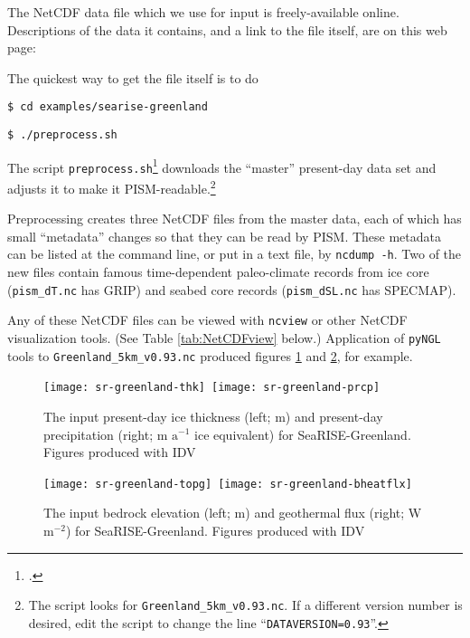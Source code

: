 The NetCDF data file which we use for input is freely-available online.  Descriptions of the data it contains, and a link to the file itself, are on this web page: 
\medskip

\centerline{}
\medskip

\noindent The quickest way to get the file itself is to do

\verb|$ cd examples/searise-greenland|

\verb|$ ./preprocess.sh|

\noindent The script \verb|preprocess.sh|\footnote{.} downloads the ``master'' present-day data set and adjusts it to make it PISM-readable.\footnote{The script looks for \texttt{Greenland\_5km\_v0.93.nc}.  If a different version number is desired, edit the script to change the line ``\texttt{DATAVERSION=0.93}''.}

Preprocessing creates three NetCDF files from the master data, each of which has small ``metadata'' changes so that they can be read by PISM.  These metadata can be listed at the command line, or put in a text file, by \verb|ncdump -h|.  Two of the new files contain famous time-dependent paleo-climate records from ice core (\verb|pism_dT.nc| has GRIP) and seabed core records (\verb|pism_dSL.nc| has SPECMAP).

Any of these NetCDF files can be viewed with \verb|ncview| or other NetCDF visualization tools.  (See Table \ref{tab:NetCDFview} below.)  Application of \verb|pyNGL| tools to \verb|Greenland_5km_v0.93.nc| produced figures \ref{fig:sr-input1} and  \ref{fig:sr-input2}, for example.

\begin{figure}[ht]
\centering
\mbox{\texttt{[image: sr-greenland-thk]}
 \qquad\qquad\texttt{[image: sr-greenland-prcp]}}
\caption{The input present-day ice thickness (left; m) and present-day precipitation (right; m $\text{a}^{-1}$ ice equivalent) for SeaRISE-Greenland.  Figures produced with IDV}
\label{fig:sr-input1}
\end{figure}

\begin{figure}[ht]
\centering
\mbox{\texttt{[image: sr-greenland-topg]}
 \qquad\quad \texttt{[image: sr-greenland-bheatflx]}}
\caption{The input bedrock elevation (left; m) and geothermal flux (right; W $\text{m}^{-2}$) for SeaRISE-Greenland.  Figures produced with IDV}
\label{fig:sr-input2}
\end{figure}


